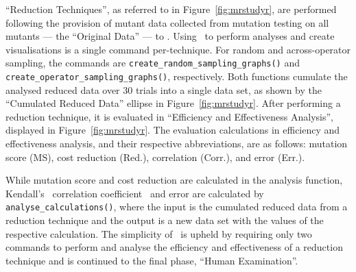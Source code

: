 ``Reduction Techniques'', as referred to in Figure~\ref{fig:mrstudyr}, are performed following the provision
of mutant data collected from mutation testing on all mutants --- the ``Original Data'' --- to \mr. Using
\mr~to perform analyses and create visualisations is a single command per-technique.
For random and across-operator sampling, the commands are {\texttt{create\_random\_sampling\_graphs()}} and
{\texttt{create\_operator\_sampling\_graphs()}}, respectively. Both functions cumulate the analysed reduced data
over 30 trials into a single data set, as shown by the ``Cumulated Reduced Data'' ellipse in
Figure~\ref{fig:mrstudyr}. After performing a reduction technique,
it is evaluated in ``Efficiency and Effectiveness Analysis'', displayed in Figure~\ref{fig:mrstudyr}.
The evaluation calculations in efficiency and effectiveness analysis, and their respective abbreviations, are as
follows: mutation score (MS), cost reduction (Red.), correlation (Corr.), and error (Err.).



While mutation score and cost reduction are calculated in the analysis function, Kendall's \taub~correlation
coefficient~\cite{mcminn2016virtual} and error are calculated by \texttt{analyse\_calculations()}, where the input is
the cumulated reduced data from a reduction technique and the output is a new data set with the values of the respective
calculation. The simplicity of \mr~is upheld by requiring only two commands to perform and analyse the efficiency and effectiveness
 of a reduction technique and is continued to the final phase, ``Human Examination''.

